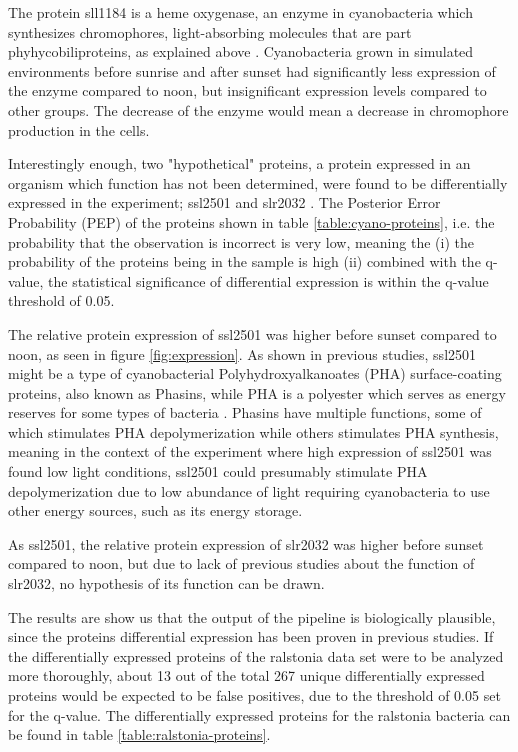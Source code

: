 The protein sll1184 is a heme oxygenase, an enzyme in cyanobacteria which synthesizes chromophores, light-absorbing molecules that are part phyhycobiliproteins, as explained above \cite{heme-oxygenase} \cite{heme-oxygenase-2}. Cyanobacteria grown in simulated environments before sunrise and after sunset had significantly less expression of the enzyme compared to noon, but insignificant expression levels compared to other groups. The decrease of the enzyme would mean a decrease in chromophore production in the cells.

Interestingly enough, two "hypothetical" proteins, a protein expressed in an organism which function has not been determined, were found to be differentially expressed in the experiment; ssl2501 and slr2032 \cite{hypothetical-protein1}. The Posterior Error Probability (PEP) of the proteins shown in table \ref{table:cyano-proteins}, i.e. the probability that the observation is incorrect is very low, meaning the (i) the probability of the proteins being in the sample is high (ii) combined with the q-value, the statistical significance of differential expression is within the q-value threshold of 0.05.

 The relative protein expression of ssl2501 was higher before sunset compared to noon, as seen in figure \ref{fig:expression}. As shown in previous studies, ssl2501 might be a type of cyanobacterial Polyhydroxyalkanoates (PHA) surface-coating proteins, also known as Phasins, while PHA is a polyester which serves as energy reserves for some types of bacteria \cite{phasins} \cite{ssl2501}. Phasins have multiple functions, some of which stimulates PHA depolymerization while others stimulates PHA synthesis, meaning in the context of the experiment where high expression of ssl2501 was found low light conditions, ssl2501 could presumably stimulate PHA depolymerization due to low abundance of light requiring cyanobacteria to use other energy sources, such as its energy storage.

As ssl2501, the relative protein expression of slr2032 was higher before sunset compared to noon, but due to lack of previous studies about the function of slr2032, no hypothesis of its function can be drawn.

The results are show us that the output of the pipeline is biologically plausible, since the proteins differential expression has been proven in previous studies. If the differentially expressed proteins of the ralstonia data set were to be analyzed more thoroughly, about 13 out of the total 267 unique  differentially expressed proteins would be expected to be false positives, due to the threshold of 0.05 set for the q-value. The differentially expressed proteins for the ralstonia bacteria can be found in table \ref{table:ralstonia-proteins}.

